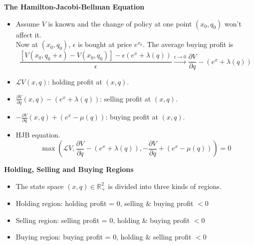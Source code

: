 \documentclass{beamer}
\begin{document}
\begin{frame}
{\bf The Hamilton-Jacobi-Bellman Equation}

\begin{itemize}
\item Assume $V$ is known and the change of policy at one point $(x_0,q_0)$ won't affect it.\\
Now at $(x_0,q_0)$, $\epsilon$ is bought at price $e^{x_0}$. The average buying profit is 
\begin{equation*}
  \frac{\left[V(x_0,q_0 + \epsilon) - V(x_0,q_0)\right] - \epsilon(e^x + \lambda(q))}{\epsilon}
  \stackrel{\epsilon \rightarrow 0}{\longrightarrow} 
  \frac{\partial V}{\partial q} - (e^x + \lambda(q))
\end{equation*}

\item $\mathcal{L}V(x,q)$: holding profit at $(x,q)$.
\item $\frac{\partial V}{\partial q}(x,q) - (e^x + \lambda(q))$: selling profit at $(x,q)$.
\item $-\frac{\partial V}{\partial q}(x,q) + (e^x - \mu(q))$: buying profit at $(x,q)$.

\item HJB equation.
\begin{equation*}
  \max\left( \mathcal{L} V, \frac{\partial V}{\partial q} - (e^x + \lambda(q)), -\frac{\partial V}{\partial q} + (e^x - \mu(q))\right) = 0
\end{equation*}



\end{itemize}

\end{frame}


\begin{frame}
{\bf Holding, Selling and Buying Regions}

\begin{itemize}
  \item The state space $(x,q) \in \mathbb{R}^2_+$ is divided into three kinds of regions.
  \item Holding region: holding profit = 0, selling \& buying profit $<0$
  \item Selling region: selling profit = 0, holding \& buying profit $<0$ 
  \item Buying region: buying profit = 0, holding \& selling profit $<0$
\end{itemize}

\end{frame}
\end{document}
